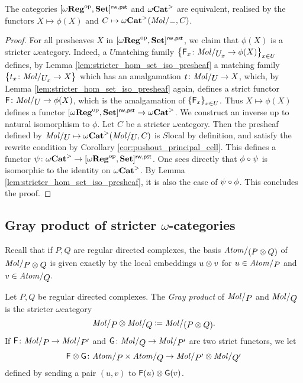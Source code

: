 \begin{prop} \label{prop:stricter_cat_are_local_presheaves}
    The categories \( [\omega\mathbf{Reg}^\mathrm{op}, \mathbf{Set}]^{\mathsf{rw, pst}} \) and \( {\omega\mathbf{Cat}}^> \) are equivalent, realised by the functors \( X \mapsto \phi(X) \) and \( C \mapsto \somegaCat(\molecin{-}, C) \). 
\end{prop}
\begin{proof}
    For all presheaves \( X \) in \( [\omega\mathbf{Reg}^\mathrm{op}, \mathbf{Set}]^{\mathsf{rw, pst}} \), we claim that \( \phi(X) \) is a stricter \( \omega \)\nbd category.
    Indeed, a \( U \)\nbd matching family \( \set{\F_x \colon \molecin{\imel{U}{x}} \to \phi(X)}_{x \in U} \) defines, by Lemma \ref{lem:stricter_hom_set_iso_presheaf} a matching family \( \set{t_x \colon \molecin{\imel{U}{x}} \to X} \) which has an amalgamation \( t \colon \molecin{U} \to X \), which, by Lemma \ref{lem:stricter_hom_set_iso_presheaf} again, defines a strict functor \( \F \colon \molecin{U} \to \phi(X) \), which is the amalgamation of \( \left\{ {\mathsf{F}_x} \right\}_{x \in U} \). 
    Thus \( X \mapsto \phi(X) \) defines a functor \( [\omega\mathbf{Reg}^\mathrm{op}, \mathbf{Set}]^{\mathsf{rw, pst}} \to {\omega\mathbf{Cat}}^> \).
    We construct an inverse up to natural isomorphism to \( \phi \).
    Let \( C \) be a stricter \( \omega \)\nbd category.
    Then the presheaf defined by \(\molecin{U} \mapsto \somegaCat(\molecin{U}, C) \) is \( S \)\nbd local by definition, and satisfy the rewrite condition by Corollary \ref{cor:pushout_principal_cell}.
    This defines a functor \( \psi \colon {\omega\mathbf{Cat}}^> \to [\omega\mathbf{Reg}^\mathrm{op}, \mathbf{Set}]^{\mathsf{rw, pst}} \).
    One sees directly that \( \phi \circ \psi \) is isomorphic to the identity on \( {\omega\mathbf{Cat}}^> \). 
    By Lemma \ref{lem:stricter_hom_set_iso_presheaf}, it is also the case of \( \psi \circ \phi \).
    This concludes the proof.
\end{proof}

\subsection{Gray product of stricter \texorpdfstring{$\omega$}{ω}-categories}

Recall that if \( P, Q \) are regular directed complexes, the basis \( \atomin{(P \gray Q)} \) of \( \molecin{P \gray Q} \) is given exactly by the local embeddings \( u \otimes v \) for \( u \in \atomin{P} \) and \( v \in \atomin{Q} \).  

\begin{dfn}  \label{dfn:gray_product_of_stricter_regular_complexes}
    Let \( P, Q \) be regular directed complexes.
    The \emph{Gray product} of \( \molecin{P} \) and \( \molecin{Q} \) is the stricter \( \omega \)\nbd category
    \begin{equation*}
        \molecin{P} \gray \molecin{Q} \eqdef \molecin{(P \gray Q)}.
    \end{equation*}
    If \( \F \colon \molecin{P} \to \molecin{P'} \) and \( \G \colon \molecin{Q} \to \molecin{P'} \) are two strict functors, we let 
    \begin{equation*}
        \F \gray \G \colon \atomin{P} \times \atomin{Q} \to  \molecin{P'} \gray \molecin{Q'}
    \end{equation*}
    defined by sending a pair \( (u, v) \) to \( \mathsf{F}(u) \otimes \mathsf{G}(v) \).
\end{dfn}

